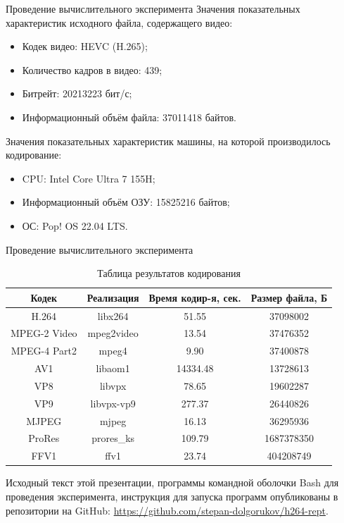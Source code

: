\documentclass{beamer}
\begin{document}
	\begin{frame}{Проведение вычислительного эксперимента}
		Значения показательных характеристик исходного файла, содержащего видео:
		\begin{itemize}
			\item Кодек видео: HEVC (H.265);
			\item Количество кадров в видео: 439;
			\item Битрейт: 20213223 бит/с;
			\item Информационный объём файла: 37011418 байтов.
		\end{itemize}
		
		Значения показательных характеристик машины, на которой производилось кодирование:
		\begin{itemize}
			\item CPU: Intel Core Ultra 7 155H;
			\item Информационный объём ОЗУ: 15825216 байтов;
			\item ОС: Pop! OS 22.04 LTS.
		\end{itemize}
	\end{frame}
		
	\begin{frame}{Проведение вычислительного эксперимента}
		\begin{table}[h]
			\centering
			\small
			\begin{tabular}{|c|c|c|c|}
				\hline
				Кодек 		 	& Реализация	& Время кодир-я, сек.	& Размер файла, Б \\ \hline
				H.264			& libx264		& 51.55				  	& 37098002 \\ \hline
				MPEG-2 Video 	& mpeg2video	& 13.54               	& 37476352 \\ \hline
				MPEG-4 Part2    & mpeg4    		& 9.90					& 37400878 \\ \hline
				AV1				& libaom1		& 14334.48				& 13728613	\\ \hline
				VP8				& libvpx		& 78.65					& 19602287 \\ \hline
				VP9				& libvpx-vp9	& 277.37				& 26440826 \\ \hline
				MJPEG			& mjpeg			& 16.13					& 36295936 \\ \hline
				ProRes			& prores\_ks	& 109.79				& 1687378350 \\ \hline
				FFV1			& ffv1			& 23.74					& 404208749 \\ \hline
			\end{tabular}
			\caption{Таблица результатов кодирования}
		\end{table}
		
		Исходный текст этой презентации, программы командной оболочки Bash для проведения эксперимента, инструкция для запуска программ опубликованы в репозитории на GitHub: \url{https://github.com/stepan-dolgorukov/h264-rept}.
	\end{frame}
\end{document}
